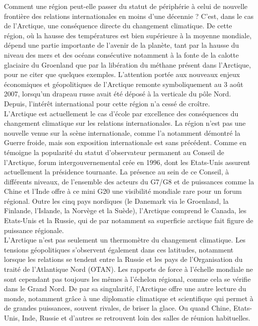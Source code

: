 \documentclass[8pt]{article}
\begin{document}
Comment une région peut-elle passer du statut de périphérie à celui de nouvelle frontière des relations internationales en moins d’une décennie ? C’est, dans le cas de l’Arctique, une conséquence directe du changement climatique. De cette région, où la hausse des températures est bien supérieure à la moyenne mondiale, dépend une partie importante de l’avenir de la planète, tant par la hausse du niveau des mers et des océans consécutive notamment à la fonte de la calotte glaciaire du Groenland que par la libération du méthane présent dans l’Arctique, pour ne citer que quelques exemples. L’attention portée aux nouveaux enjeux économiques et géopolitiques de l’Arctique remonte symboliquement au 3 août 2007, lorsqu’un drapeau russe avait été déposé à la verticale du pôle Nord. Depuis, l’intérêt international pour cette région n’a cessé de croître.\\

L’Arctique est actuellement le cas d’école par excellence des conséquences du changement climatique sur les relations internationales. La région n’est pas une nouvelle venue sur la scène internationale, comme l’a notamment démontré la Guerre froide, mais son exposition internationale est sans précédent. Comme en témoigne la popularité du statut d’observateur permanent au Conseil de l’Arctique, forum intergouvernemental crée en 1996, dont les Etats-Unis assurent actuellement la présidence tournante. La présence au sein de ce Conseil, à différents niveaux, de l’ensemble des acteurs du G7/G8 et de puissances comme la Chine et l’Inde offre à ce mini G20 une visibilité mondiale rare pour un forum régional. Outre les cinq pays nordiques (le Danemark via le Groenland, la Finlande, l’Islande, la Norvège et la Suède), l’Arctique comprend le Canada, les Etats-Unis et la Russie, qui de par notamment sa superficie arctique fait figure de puissance régionale.\\


L’Arctique n’est pas seulement un thermomètre du changement climatique. Les tensions géopolitiques s’observent également dans ces latitudes, notamment lorsque les relations se tendent entre la Russie et les pays de l’Organisation du traité de l’Atlantique Nord (OTAN). Les rapports de force à l’échelle mondiale ne sont cependant pas toujours les mêmes à l’échelon régional, comme cela se vérifie dans le Grand Nord. De par sa singularité, l’Arctique offre une autre lecture du monde, notamment grâce à une diplomatie climatique et scientifique qui permet à de grandes puissances, souvent rivales, de briser la glace. Ou quand Chine, Etats-Unis, Inde, Russie et d’autres se retrouvent loin des salles de réunion habituelles.\\
\end{document}
